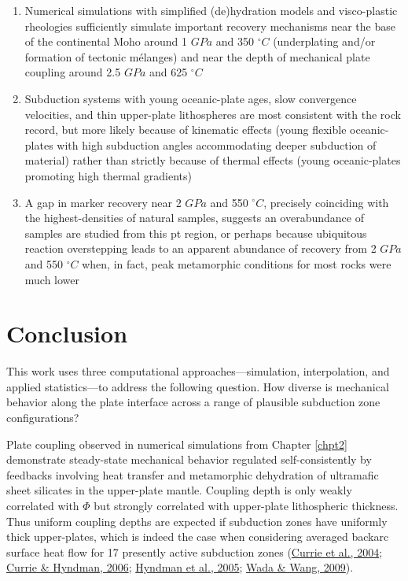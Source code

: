 \begin{enumerate}
\def\labelenumi{\arabic{enumi}.}
\item
  Numerical simulations with simplified (de)hydration models and visco-plastic rheologies sufficiently simulate important recovery mechanisms near the base of the continental Moho around 1 \(GPa\) and 350 \(^\circ C\) (underplating and/or formation of tectonic mélanges) and near the depth of mechanical plate coupling around 2.5 \(GPa\) and 625 \(^\circ C\)
\item
  Subduction systems with young oceanic-plate ages, slow convergence velocities, and thin upper-plate lithospheres are most consistent with the rock record, but more likely because of kinematic effects (young flexible oceanic-plates with high subduction angles accommodating deeper subduction of material) rather than strictly because of thermal effects (young oceanic-plates promoting high thermal gradients)
\item
  A gap in marker recovery near 2 \(GPa\) and 550 \(^\circ C\), precisely coinciding with the highest-densities of natural samples, suggests an overabundance of samples are studied from this \gls{pt} region, or perhaps because ubiquitous reaction overstepping leads to an apparent abundance of recovery from 2 \(GPa\) and 550 \(^\circ C\) when, in fact, peak metamorphic conditions for most rocks were much lower
\end{enumerate}

\cleardoublepage

\hypertarget{chpt5}{%
\chapter{Conclusion}\label{chpt5}}


This work uses three computational approaches---simulation, interpolation, and applied statistics---to address the following question. How diverse is mechanical behavior along the plate interface across a range of plausible subduction zone configurations?

Plate coupling observed in numerical simulations from Chapter \ref{chpt2} demonstrate steady-state mechanical behavior regulated self-consistently by feedbacks involving heat transfer and metamorphic dehydration of ultramafic sheet silicates in the upper-plate mantle. Coupling depth is only weakly correlated with \(\Phi\) but strongly correlated with upper-plate lithospheric thickness. Thus uniform coupling depths are expected if subduction zones have uniformly thick upper-plates, which is indeed the case when considering averaged backarc surface heat flow for 17 presently active subduction zones (\protect\hyperlink{ref-currie2004}{Currie et al., 2004}; \protect\hyperlink{ref-currie2006}{Currie \& Hyndman, 2006}; \protect\hyperlink{ref-hyndman2005}{Hyndman et al., 2005}; \protect\hyperlink{ref-wada2009}{Wada \& Wang, 2009}).

